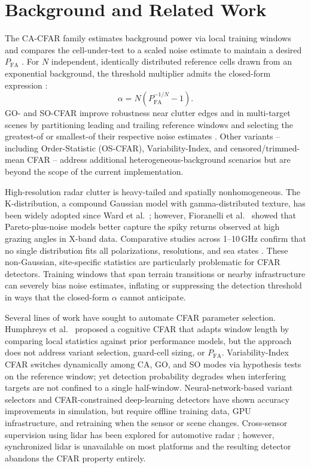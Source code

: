 \documentclass[conf]{new-aiaa}
\begin{document}
\section{Background and Related Work}
The CA-CFAR family estimates background power via local training windows and compares the cell-under-test to a scaled noise estimate to maintain a desired $P_{\mathrm{FA}}$ \cite{Finn1968, Gandhi1988}. For $N$ independent, identically distributed reference cells drawn from an exponential background, the threshold multiplier admits the closed-form expression \cite{Richards2022, Finn1968}:
\begin{equation}
    \alpha = N\!\left(P_{\mathrm{FA}}^{-1/N} - 1\right). \label{eq:alpha}
\end{equation}
GO- and SO-CFAR improve robustness near clutter edges and in multi-target scenes by partitioning leading and trailing reference windows and selecting the greatest-of or smallest-of their respective noise estimates \cite{Hansen1972, Trunk1978}. Other variants -- including Order-Statistic (OS-CFAR), Variability-Index, and censored/trimmed-mean CFAR -- address additional heterogeneous-background scenarios \cite{Farina1987} but are beyond the scope of the current implementation.

High-resolution radar clutter is heavy-tailed and spatially nonhomogeneous. The K-distribution, a compound Gaussian model with gamma-distributed texture, has been widely adopted since Ward et al.\ \cite{Ward2006}; however, Fioranelli et al.\ \cite{Rosenberg2013} showed that Pareto-plus-noise models better capture the spiky returns observed at high grazing angles in X-band data. Comparative studies across 1--10\,GHz confirm that no single distribution fits all polarizations, resolutions, and sea states \cite{Angelliaume2019}. These non-Gaussian, site-specific statistics are particularly problematic for CFAR detectors. Training windows that span terrain transitions or nearby infrastructure can severely bias noise estimates, inflating or suppressing the detection threshold in ways that the closed-form $\alpha$ cannot anticipate.

Several lines of work have sought to automate CFAR parameter selection. Humphreys et al.\ \cite{Humphreys2022} proposed a cognitive CFAR that adapts window length by comparing local statistics against prior performance models, but the approach does not address variant selection, guard-cell sizing, or $P_{\mathrm{FA}}$. Variability-Index CFAR \cite{Smith2000} switches dynamically among CA, GO, and SO modes via hypothesis tests on the reference window; yet detection probability degrades when interfering targets are not confined to a single half-window. Neural-network-based variant selectors \cite{Rohman2019} and CFAR-constrained deep-learning detectors \cite{Diskin2024} have shown accuracy improvements in simulation, but require offline training data, GPU infrastructure, and retraining when the sensor or scene changes. Cross-sensor supervision using lidar has been explored for automotive radar \cite{Roldan2024}; however, synchronized lidar is unavailable on most platforms and the resulting detector abandons the CFAR property entirely.
\end{document}
